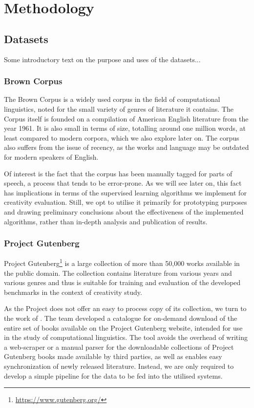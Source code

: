 \chapter{Methodology}
\label{chap:methods}

\section{Datasets}
Some introductory text on the purpose and uses of the datasets...
\subsection{Brown Corpus}
The Brown Corpus \citep*{francis1979brown} is a widely used corpus in the field of computational linguistics, noted for the small variety of genres of literature it contains. The Corpus itself is founded on a compilation of American English literature from the year 1961. It is also small in terms of size, totalling around one million words, at least compared to modern corpora, which we also explore later on. The corpus also suffers from the issue of recency, as the works and language may be outdated for modern speakers of English.

Of interest is the fact that the corpus has been manually tagged for parts of speech, a process that tends to be error-prone. %
As we will see later on, this fact has implications in terms of the supervised learning algorithms we implement for creativity evaluation. Still, we opt to utilise it primarily for prototyping purposes and drawing preliminary conclusions about the effectiveness of the implemented algorithms, rather than in-depth analysis and publication of results.

\subsection{Project Gutenberg}
Project Gutenberg\footnote[1]{\url{https://www.gutenberg.org/}} is a large collection of more than 50,000 works available in the public domain. The collection contains literature from various years and various genres and thus is suitable for training and evaluation of the developed benchmarks in the context of creativity study. 

As the Project does not offer an easy to process copy of its collection, we turn to the work of \cite{DBLP:journals/corr/abs-1812-08092}. The team developed a catalogue for on-demand download of the entire set of books available on the Project Gutenberg website, intended for use in the study of computational linguistics. The tool avoids the overhead of writing a web-scraper or a manual parser for the downloadable collections of Project Gutenberg books made available by third parties, as well as enables easy synchronization of newly released literature. Instead, we are only required to develop a simple pipeline for the data to be fed into the utilised systems. 

